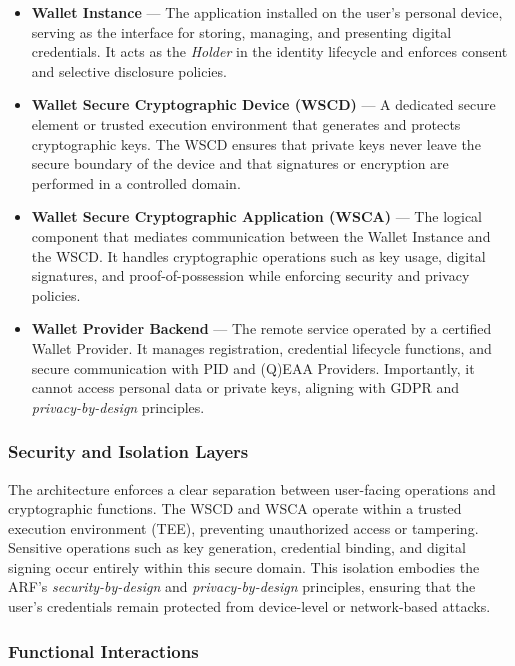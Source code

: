 \documentclass[sigconf,balance,nonacm,authordraft]{acmart}
\begin{document}
\begin{itemize}
    \item \textbf{Wallet Instance} — The application installed on the user’s personal device, serving as the interface for storing, managing, and presenting digital credentials. It acts as the \textit{Holder} in the identity lifecycle and enforces consent and selective disclosure policies.
    \item \textbf{Wallet Secure Cryptographic Device (WSCD)} — A dedicated secure element or trusted execution environment that generates and protects cryptographic keys. The WSCD ensures that private keys never leave the secure boundary of the device and that signatures or encryption are performed in a controlled domain.
    \item \textbf{Wallet Secure Cryptographic Application (WSCA)} — The logical component that mediates communication between the Wallet Instance and the WSCD. It handles cryptographic operations such as key usage, digital signatures, and proof-of-possession while enforcing security and privacy policies.
    \item \textbf{Wallet Provider Backend} — The remote service operated by a certified Wallet Provider. It manages registration, credential lifecycle functions, and secure communication with PID and (Q)EAA Providers. Importantly, it cannot access personal data or private keys, aligning with GDPR and \textit{privacy-by-design} principles.
\end{itemize}

\subsubsection*{Security and Isolation Layers}

The architecture enforces a clear separation between user-facing operations and cryptographic functions. The WSCD and WSCA operate within a trusted execution environment (TEE), preventing unauthorized access or tampering. Sensitive operations such as key generation, credential binding, and digital signing occur entirely within this secure domain. This isolation embodies the ARF’s \textit{security-by-design} and \textit{privacy-by-design} principles, ensuring that the user’s credentials remain protected from device-level or network-based attacks.

\subsubsection*{Functional Interactions}
\end{document}
